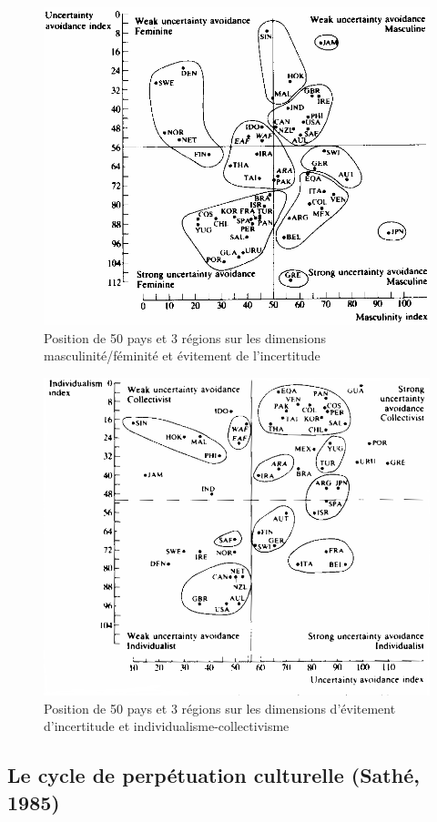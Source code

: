 \documentclass[12pt]{article}
\begin{document}
	  \begin{figure}[!ht]
	   \begin{center}
	    \includegraphics[width=0.65\linewidth]{hofstede_masc_incertitudes.png}
	    \caption{Position de 50 pays et 3 régions sur les dimensions masculinité/féminité et évitement de l'incertitude}
	   \end{center}
	  \end{figure}
	  
	  \begin{figure}[!ht]
	   \begin{center}
	    \includegraphics[width=0.65\linewidth]{hofstede_incertitudes_indivi.png}
	    \caption{Position de 50 pays et 3 régions sur les dimensions d'évitement d'incertitude et individualisme-collectivisme}
	   \end{center}
	  \end{figure}

	  \FloatBarrier %


	\subsection{Le cycle de perpétuation culturelle (Sathé, 1985)}
\end{document}
